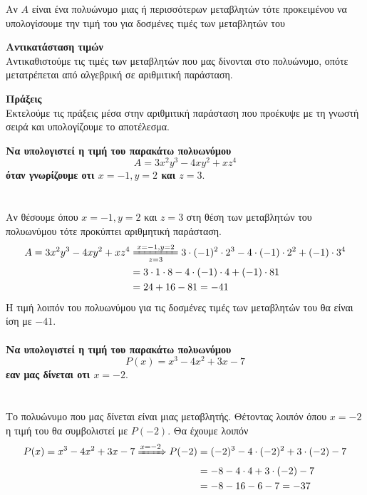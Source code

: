 \documentclass[twoside,nofonts,internet,methodoi]{thewria}
\newcommand{\eqq}[2]{\xlongequal[#2]{#1}}
\begin{document}
\clearpage
{}
\clearpage
{}
\begin{Methodos}
Αν $ A $ είναι ένα πολυώνυμο μιας ή περισσότερων μεταβλητών τότε προκειμένου να υπολογίσουμε την τιμή του για δοσμένες τιμές των μεταβλητών του
\begin{bhma}
\item \textbf{Αντικατάσταση τιμών}\\
Αντικαθιστούμε τις τιμές των μεταβλητών που μας δίνονται στο πολυώνυμο, οπότε μετατρέπεται από αλγεβρική σε αριθμιτική παράσταση.
\item \textbf{Πράξεις}\\
Εκτελούμε τις πράξεις μέσα στην αριθμιτική παράσταση που προέκυψε με τη γνωστή σειρά και υπολογίζουμε το αποτέλεσμα.
\end{bhma}
\end{Methodos}
\textbf{Να υπολογιστεί η τιμή του παρακάτω πολυωνύμου}
{\boldmath \[ A=3x^2y^3-4xy^2+xz^4 \]}
\textbf{όταν γνωρίζουμε οτι {\boldmath$ x=-1, y=2 $} και {\boldmath$ z=3 $}}.\\\\
\lysh\\
Αν θέσουμε όπου $ x=-1, y=2 $ και $ z=3 $ στη θέση των μεταβλητών του πολυωνύμου τότε προκύπτει αριθμητική παράσταση.
\begin{align*}
A=3x^2y^3-4xy^2+xz^4&\eqq{x=-1,y=2}{z=3} 3\cdot(-1)^2\cdot2^3-4\cdot(-1)\cdot2^2+(-1)\cdot3^4\\&=3\cdot 1\cdot 8-4\cdot(-1)\cdot4+(-1)\cdot81\\
&=24+16-81=-41
\end{align*}
Η τιμή λοιπόν του πολυωνύμου για τις δοσμένες τιμές των μεταβλητών του θα είναι ίση με $ -41 $.\\\\
\textbf{Να υπολογιστεί η τιμή του παρακάτω πολυωνύμου}
{\boldmath \[ P(x)=x^3-4x^2+3x-7 \]}
\textbf{εαν μας δίνεται οτι {\boldmath$ x=-2$}}.\\\\
\lysh\\
Το πολυώνυμο που μας δίνεται είναι μιας μεταβλητής. Θέτοντας λοιπόν όπου $ x=-2 $ η τιμή του θα συμβολιστεί με $ P(-2) $. Θα έχουμε λοιπόν
\begin{align*} P(x)=x^3-4x^2+3x-7\xRightarrow{x=-2}P(-2)&=(-2)^3-4\cdot(-2)^2+3\cdot(-2)-7\\
&=-8-4\cdot4+3\cdot(-2)-7\\
&=-8-16-6-7=-37 
\end{align*}
\end{document}
